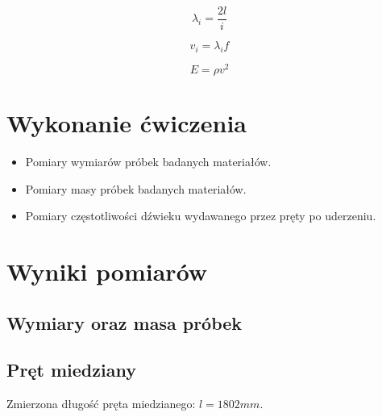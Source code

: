 \documentclass[a4paper,10pt,twoside]{article}
\begin{document}
$$ \lambda_i = \frac{2l}{i} $$

$$ v_i = \lambda_if $$

$$ E = \rho v^2 $$


\section{Wykonanie ćwiczenia}

\begin{itemize}
	\item Pomiary wymiarów próbek badanych materiałów.
	\item Pomiary masy próbek badanych materiałów.
	\item Pomiary częstotliwości dźwieku wydawanego przez pręty po uderzeniu.
\end{itemize}

\section{Wyniki pomiarów}

\subsection{Wymiary oraz masa próbek}



\subsection{Pręt miedziany}

Zmierzona długość pręta miedzianego: $ l = 1802 \unit{mm} $.
\end{document}
